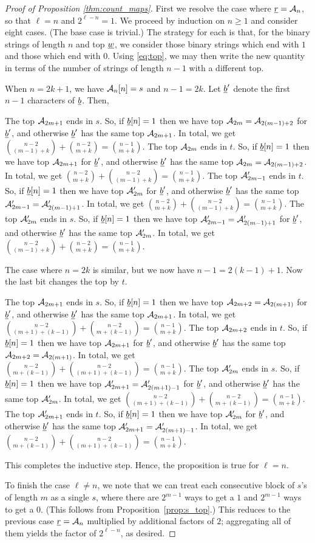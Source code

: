 \begin{proof}[Proof of Proposition \ref{thm:count_maps}]
	First we resolve the case where $\ul r = \AA_n$, so that $\ell = n$ and $2^{\ell-n} = 1$.  We proceed by induction on $n \ge 1$ and consider eight cases.  (The base case is trivial.) The strategy for each is that, for the binary strings of length $n$ and top $\ul w$, we consider those binary strings which end with $1$ and those which end with $0$.  Using \eqref{eq:top}, we may then write the new quantity in terms of the number of strings of length $n-1$ with a different top.

	When $n = 2k+1$, we have $\AA_n[n] = s$ and $n-1 = 2k$.  Let $\ul b'$ denote the first $n-1$ characters of $\ul b$.  Then,
	\newcommand{\aoeu}[5]{The top #1 ends in #2.  So, if $\ul b[n] = 1$ then we have top #3 for $\ul b'$, and otherwise $\ul b'$ has the same top #4.  In total, we get #5.}
	\begin{itemize}
		\ii \aoeu{$\AA_{2m+1}$}{$s$}{$\AA_{2m} = \AA_{2(m-1)+2}$}{$\AA_{2m+1}$}%
		{$\binom{n-2}{(m-1)+k} + \binom{n-2}{m+k} = \binom{n-1}{m+k}$}
		\ii \aoeu{$\AA_{2m}$}{$t$}{$\AA_{2m+1}$}{$\AA_{2m} = \AA_{2(m-1)+2}$}%
		{$\binom{n-2}{m+k} + \binom{n-2}{(m-1)+k} = \binom{n-1}{m+k}$}
		\ii \aoeu{$\AA_{2m-1}'$}{$t$}{$\AA_{2m}'$}{$\AA_{2m-1}' = \AA_{2(m-1)+1}'$}%
		{$\binom{n-2}{m+k} + \binom{n-2}{(m-1)+k} = \binom{n-1}{m+k}$}
		\ii \aoeu{$\AA_{2m}'$}{$s$}{$\AA_{2m-1}' = \AA_{2(m-1)+1}'$}{$\AA_{2m}'$}%
		{$\binom{n-2}{(m-1)+k} + \binom{n-2}{m+k} = \binom{n-1}{m+k}$}
	\end{itemize}
	The case where $n=2k$ is similar, but we now have $n-1=2(k-1)+1$.  Now the last bit changes the top by $t$.
	\begin{itemize}
		\ii \aoeu{$\AA_{2m+1}$}{$s$}{$\AA_{2m+2} = \AA_{2(m+1)}$}{$\AA_{2m+1}$}%
		{$\binom{n-2}{(m+1)+(k-1)} + \binom{n-2}{m+(k-1)} = \binom{n-1}{m+k}$}
		\ii \aoeu{$\AA_{2m+2}$}{$t$}{$\AA_{2m+1}$}{$\AA_{2m+2} = \AA_{2(m+1)}$}%
		{$\binom{n-2}{m+(k-1)} + \binom{n-2}{(m+1)+(k-1)} = \binom{n-1}{m+k}$}
		\ii \aoeu{$\AA_{2m}'$}{$s$}{$\AA_{2m+1}' = \AA_{2(m+1)-1}'$}{$\AA_{2m}'$}%
		{$\binom{n-2}{(m+1)+(k-1)} + \binom{n-2}{m+(k-1)} = \binom{n-1}{m+k}$}
		\ii \aoeu{$\AA_{2m+1}'$}{$t$}{$\AA_{2m}'$}{$\AA_{2m+1}'=\AA_{2(m+1)-1}'$}%
		{$\binom{n-2}{m+(k-1)} + \binom{n-2}{(m+1)+(k-1)} = \binom{n-1}{m+k}$}
	\end{itemize}
	This completes the inductive step.  Hence, the proposition is true for $\ell = n$.

	To finish the case $\ell \neq n$, we note that we can treat each consecutive block of $s$'s of length $m$ as a single $s$, where there are $2^{m-1}$ ways to get a $1$ and $2^{m-1}$ ways to get a $0$.  (This follows from Proposition~\ref{prop:s_top}.)  This reduces to the previous case $\ul r = \AA_n$ multiplied by additional factors of $2$; aggregating all of them yields the factor of $2^{\ell-n}$, as desired.
\end{proof}



